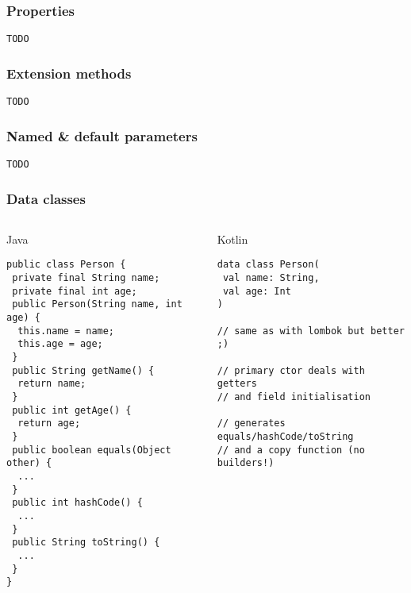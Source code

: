 \begin{frame}[fragile] \frametitle{Properties}
\begin{lstlisting}
TODO
\end{lstlisting}
\end{frame}


\begin{frame}[fragile] \frametitle{Extension methods}
\begin{lstlisting}
TODO
\end{lstlisting}
\end{frame}


\begin{frame}[fragile] \frametitle{Named \& default parameters}
\begin{lstlisting}
TODO
\end{lstlisting}
\end{frame}



\begin{frame}[fragile]
\frametitle{Data classes}
\begin{columns}[t]
\begin{column}{0.5\textwidth}
\begin{center}
  Java
\end{center}
\begin{lstlisting}[style=twosided]
public class Person {
 private final String name;
 private final int age;
 public Person(String name, int age) {
  this.name = name;
  this.age = age;
 }
 public String getName() {
  return name;
 }
 public int getAge() {
  return age;
 }
 public boolean equals(Object other) {
  ...
 }
 public int hashCode() {
  ...
 }
 public String toString() {
  ...
 }
}
\end{lstlisting}

\end{column}
\begin{column}{0.5\textwidth}
\begin{center}
  Kotlin
\end{center}
\begin{lstlisting}[style=twosided]
data class Person(
 val name: String,
 val age: Int
)

// same as with lombok but better ;)

// primary ctor deals with getters
// and field initialisation

// generates equals/hashCode/toString
// and a copy function (no builders!)
\end{lstlisting}
\end{column}
\end{columns}
\end{frame}


